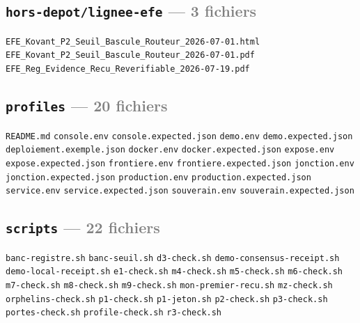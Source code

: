 \documentclass[10pt]{report}
\newcommand{\code}[1]{\texttt{\small #1}}
\begin{document}
\subsection*{\code{hors-depot/lignee-efe} \normalfont\textcolor{grey}{--- 3 fichiers}}
\begin{sloppypar}\footnotesize\raggedright
\code{EFE\_Kovant\_P2\_Seuil\_Bascule\_Routeur\_2026-07-01.html} \;\textbullet\; \code{EFE\_Kovant\_P2\_Seuil\_Bascule\_Routeur\_2026-07-01.pdf} \;\textbullet\; \code{EFE\_Reg\_Evidence\_Recu\_Reverifiable\_2026-07-19.pdf}
\end{sloppypar}

\subsection*{\code{profiles} \normalfont\textcolor{grey}{--- 20 fichiers}}
\begin{sloppypar}\footnotesize\raggedright
\code{README.md} \;\textbullet\; \code{console.env} \;\textbullet\; \code{console.expected.json} \;\textbullet\; \code{demo.env} \;\textbullet\; \code{demo.expected.json} \;\textbullet\; \code{deploiement.exemple.json} \;\textbullet\; \code{docker.env} \;\textbullet\; \code{docker.expected.json} \;\textbullet\; \code{expose.env} \;\textbullet\; \code{expose.expected.json} \;\textbullet\; \code{frontiere.env} \;\textbullet\; \code{frontiere.expected.json} \;\textbullet\; \code{jonction.env} \;\textbullet\; \code{jonction.expected.json} \;\textbullet\; \code{production.env} \;\textbullet\; \code{production.expected.json} \;\textbullet\; \code{service.env} \;\textbullet\; \code{service.expected.json} \;\textbullet\; \code{souverain.env} \;\textbullet\; \code{souverain.expected.json}
\end{sloppypar}

\subsection*{\code{scripts} \normalfont\textcolor{grey}{--- 22 fichiers}}
\begin{sloppypar}\footnotesize\raggedright
\code{banc-registre.sh} \;\textbullet\; \code{banc-seuil.sh} \;\textbullet\; \code{d3-check.sh} \;\textbullet\; \code{demo-consensus-receipt.sh} \;\textbullet\; \code{demo-local-receipt.sh} \;\textbullet\; \code{e1-check.sh} \;\textbullet\; \code{m4-check.sh} \;\textbullet\; \code{m5-check.sh} \;\textbullet\; \code{m6-check.sh} \;\textbullet\; \code{m7-check.sh} \;\textbullet\; \code{m8-check.sh} \;\textbullet\; \code{m9-check.sh} \;\textbullet\; \code{mon-premier-recu.sh} \;\textbullet\; \code{mz-check.sh} \;\textbullet\; \code{orphelins-check.sh} \;\textbullet\; \code{p1-check.sh} \;\textbullet\; \code{p1-jeton.sh} \;\textbullet\; \code{p2-check.sh} \;\textbullet\; \code{p3-check.sh} \;\textbullet\; \code{portes-check.sh} \;\textbullet\; \code{profile-check.sh} \;\textbullet\; \code{r3-check.sh}
\end{sloppypar}
\end{document}
